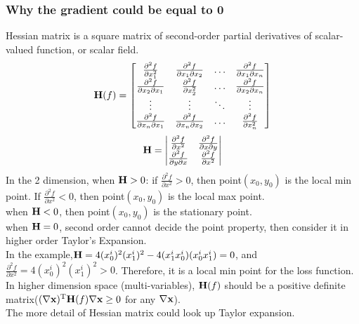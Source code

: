 \documentclass[12pt,a4paper]{article}
\begin{document}
\subsubsection*{Why the gradient could be equal to 0}
Hessian matrix is a square matrix of second-order partial derivatives of scalar-valued function, or scalar field.
\begin{equation}
{\bf H}(f) = \left[
\begin{matrix}
\frac{\partial^2f}{\partial x_1^2} & \frac{\partial^2f}{\partial x_1 \partial x_2} & \ldots & \frac{\partial^2f}{\partial x_1 \partial x_n}\\
\frac{\partial^2f}{\partial x_2 \partial x_1} & \frac{\partial^2f}{\partial x_2^2} & \ldots & \frac{\partial^2f}{\partial x_2 \partial x_n}\\
\vdots & \vdots & \ddots & \vdots\\
\frac{\partial^2f}{\partial x_n \partial x_1} & \frac{\partial^2f}{\partial x_n \partial x_2} & \ldots & \frac{\partial^2f}{\partial x_n^2}\\
\end{matrix}
\right]
\end{equation}
$$
{\bf H} = \left|
\begin{matrix}
\frac{\partial^2f}{\partial x^2} & \frac{\partial^2f}{\partial x \partial y}\\
 \frac{\partial^2f}{\partial y \partial x} & \frac{\partial^2f}{\partial x^2}\\
\end{matrix}
\right|
$$
In the 2 dimension, when ${\bf H}>0$: if $\frac{\partial^2f}{\partial x^2}>0$, then point$(x_0,y_0)$ is the local min point. If $\frac{\partial^2f}{\partial x^2}<0$, then point$(x_0,y_0)$ is the local max point.\\
when ${\bf H}<0$, then point$(x_0,y_0)$ is the  stationary point.\\
when ${\bf H}=0$, second order cannot decide the point property, then consider it in higher order Taylor's Expansion.\\
In the example,${\bf H} = 4(x_0^i)^2(x_1^i)^2-4(x_1^ix_0^i)(x_0^ix_1^i)=0$, and $\frac{\partial^2f}{\partial x^2}=4(x_0^i)^2(x_1^i)^2>0$. Therefore, it is a local min point for the loss function.
\\
In higher dimension space (multi-variables), ${\bf H}(f)$ should be a positive definite matrix($(\nabla {\bf x})^{\rm T}{\bf H}(f)\nabla {\bf x}\geq 0$ for any $\nabla {\bf x}$).\\
The more detail of Hessian matrix could look up Taylor expansion.
\end{document}
